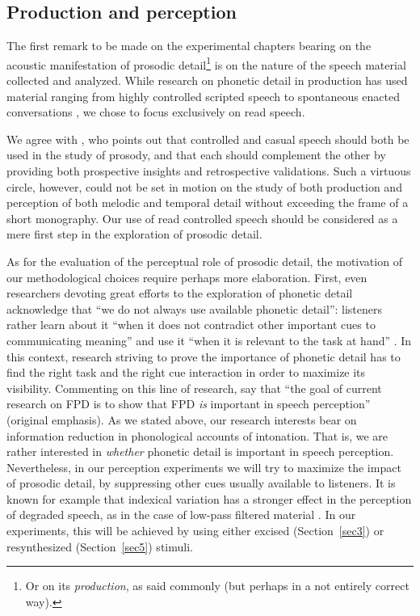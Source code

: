 \subsection{Production and perception}\label{sec131}
The first remark to be made on the experimental chapters bearing on the acoustic manifestation of prosodic detail\footnote{Or on its \textit{production}, as said commonly (but perhaps in a not entirely correct way).} is on the nature of the speech material collected and analyzed. While research on phonetic detail in production has used material ranging from highly controlled scripted speech to spontaneous enacted conversations \citep{beckman1997typology}, we chose to focus exclusively on read speech. 

We agree with \citet{gilifivela2008intonation}, who points out that controlled and casual speech should both be used in the study of prosody, and that each should complement the other by providing both prospective insights and retrospective validations. Such a virtuous circle, however, could not be set in motion on the study of both production and perception of both melodic and temporal detail without exceeding the frame of a short monography. Our use of read controlled speech should be considered as a mere first step in the exploration of prosodic detail.

As for the evaluation of the perceptual role of prosodic detail, the motivation of our methodological choices require perhaps more elaboration. First, even researchers devoting great efforts to the exploration of phonetic detail acknowledge that ``we do not always use available phonetic detail'': listeners rather learn about it ``when it does not contradict other important cues to communicating meaning'' and use it ``when it is relevant to the task at hand'' \cite[9]{hawkins2011phonetic}. In this context, research striving to prove the importance of phonetic detail has to find the right task and the right cue interaction in order to maximize its visibility. Commenting on this line of research, \citet[8]{nguyen2009dynamical} say that ``the goal of current research on FPD is to show that FPD \textit{is} important in speech perception'' (original emphasis). As we stated above, our research interests bear on information reduction in phonological accounts of intonation. That is, we are rather interested in \textit{whether} phonetic detail is important in speech perception. Nevertheless, in our perception experiments we will try to maximize the impact of prosodic detail, by suppressing other cues usually available to listeners. It is known for example that indexical variation has a stronger effect in the perception of degraded speech, as in the case of low-pass filtered material \citep{church1994perceptual}. In our experiments, this will be achieved by using either excised (Section~\ref{sec3}) or resynthesized (Section~\ref{sec5}) stimuli.

